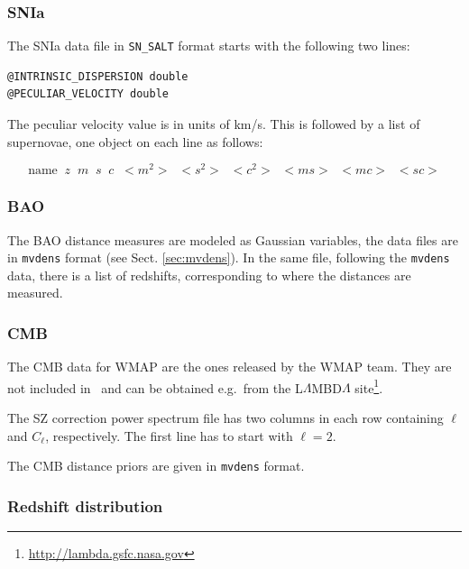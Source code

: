 \documentclass[11pt, chapterprefix, headsepline]{scrartcl}
\begin{document}
\begin{appendix}
\subsubsection{SNIa}

The SNIa data file in \texttt{SN\_SALT} format starts with the
following two lines:

\begin{verbatim}
@INTRINSIC_DISPERSION double
@PECULIAR_VELOCITY double
\end{verbatim}

The peculiar velocity value is in units of km/s.
This is followed by a list of supernovae, one object on each line as
follows:

$$\mbox{name} \;\; z \;\; m \;\; s \;\; c \;\; <m^2> \;\; <s^2>
\;\; <c^2> \;\; <ms> \;\; <mc> \;\; <sc>$$


\subsubsection{BAO}

The BAO distance measures are modeled as Gaussian variables, the data
files are in \texttt{mvdens} format (see Sect. \ref{sec:mvdens}). In the same
file, following the \texttt{mvdens} data, there is a list of
redshifts, corresponding to where the distances are measured.

\subsubsection{CMB}

The CMB data for WMAP are the ones released by  the WMAP team. They
are not included in \CosmoPMC\ and can be obtained e.g.\ from the
L$\Lambda$MBD$\Lambda$
site\footnote{\url{http://lambda.gsfc.nasa.gov}}.

The SZ correction power spectrum file has two columns in each row
containing $\ell$ and $C_\ell$, respectively. The first line has to
start with $\ell = 2$.

The CMB distance priors \citep{WMAP5-Komatsu08} are given in
\texttt{mvdens} format.


\subsubsection{Redshift distribution}
\label{sec:nofz_file}



\end{appendix}
\end{document}
